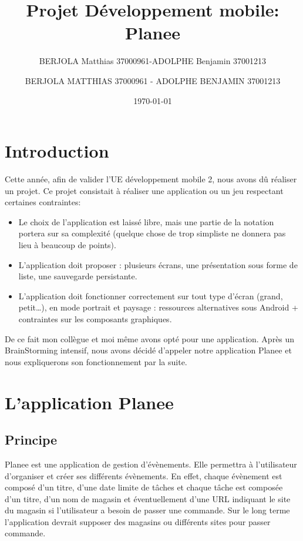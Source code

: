 \documentclass[12pt,a4paper]{report}
\author{BERJOLA Matthias 37000961-ADOLPHE Benjamin 37001213}           %
\begin{document}
\title{Projet Développement mobile: Planee}
\author{BERJOLA MATTHIAS 37000961 - ADOLPHE BENJAMIN 37001213}
\date{\today} 

\maketitle


\newpage

\tableofcontents

\chapter{Introduction}  
\begin{flushleft}
\justify
Cette année, afin de valider l'UE développement mobile 2, nous avons dû réaliser un projet. Ce projet consistait à réaliser une application ou un jeu respectant certaines contraintes:
\begin{itemize}
\item Le choix de l'application est laissé libre, mais une partie de la notation portera sur sa complexité (quelque chose de trop simpliste ne donnera pas lieu à beaucoup de points).
\item L’application doit proposer : plusieurs écrans, une présentation
sous forme de liste, une sauvegarde persistante.
\item L’application doit fonctionner correctement sur tout type d’écran (grand, petit…), en mode portrait et paysage : ressources alternatives sous Android + contraintes sur les composants graphiques.
\end{itemize}
De ce fait mon collègue et moi même avons opté pour une application. Après un BrainStorming intensif, nous avons décidé d'appeler notre application Planee et nous expliquerons son fonctionnement par la suite.
\end{flushleft}

\newpage
\chapter{L'application Planee}
\section{Principe}
\begin{flushleft}
\justify
Planee est une application de gestion d'évènements. Elle permettra à l'utilisateur d'organiser et créer ses différents évènements. En effet, chaque évènement est composé d'un titre, d'une date limite de tâches et chaque tâche est composée d'un titre, d'un nom de magasin et éventuellement d'une URL indiquant le site du magasin si l'utilisateur a besoin de passer une commande. Sur le long terme l'application devrait supposer des magasins ou différents sites pour passer commande.
\end{flushleft}
\end{document}
